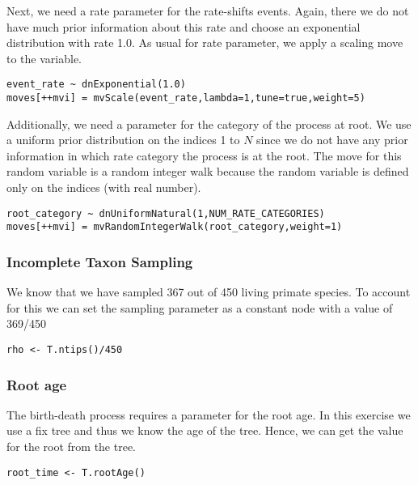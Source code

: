 Next, we need a rate parameter for the rate-shifts events.
Again, there we do not have much prior information about this rate and choose an exponential distribution with rate 1.0.
As usual for rate parameter, we apply a scaling move to the  variable.
{\tt \begin{snugshade*}
\begin{lstlisting}
event_rate ~ dnExponential(1.0)
moves[++mvi] = mvScale(event_rate,lambda=1,tune=true,weight=5)
\end{lstlisting}
\end{snugshade*}}

Additionally, we need a parameter for the category of the process at root.
We use a uniform prior distribution on the indices 1 to $N$ since we do not have any prior information in which rate category the process is at the root.
The move for this random variable is a random integer walk because the random variable is defined only on the indices (\CF with real number).
{\tt \begin{snugshade*}
\begin{lstlisting}
root_category ~ dnUniformNatural(1,NUM_RATE_CATEGORIES)
moves[++mvi] = mvRandomIntegerWalk(root_category,weight=1)
\end{lstlisting}
\end{snugshade*}}



\subsubsection{Incomplete Taxon Sampling}

We know that we have sampled 367 out of 450 living primate species. 
To account for this we can set the sampling parameter as a constant node with a value of 369/450
{\tt \begin{snugshade*}
\begin{lstlisting}
rho <- T.ntips()/450
\end{lstlisting}
\end{snugshade*}}


\subsubsection{Root age}

The birth-death process requires a parameter for the root age.
In this exercise we use a fix tree and thus we know the age of the tree.
Hence, we can get the value for the root from the \citet{Springer2012} tree.
{\tt \begin{snugshade*}
\begin{lstlisting}
root_time <- T.rootAge()
\end{lstlisting}
\end{snugshade*}}

